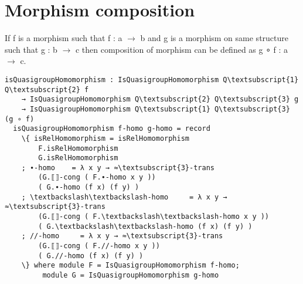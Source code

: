 \section{Morphism composition}
If f is a morphism such that f : a \(\rightarrow\) b and g is a morphism on same structure such that g : b \(\rightarrow\) c then composition of morphism can be defined as g ∘ f : a \(\rightarrow\) c.
\begin{comment}
module _ \{Q\textsubscript{1} : RawQuasigroup a ℓ\textsubscript{1}\}  \{Q\textsubscript{2} : RawQuasigroup b ℓ\textsubscript{2}\} \{Q\textsubscript{3} : RawQuasigroup c ℓ\textsubscript{3}\}
         (open RawQuasigroup) (≈\textsubscript{3}-trans : Transitive (_≈_ Q\textsubscript{3}))
         \{f : Carrier Q\textsubscript{1} → Carrier Q\textsubscript{2}\} \{g : Carrier Q\textsubscript{2} → Carrier Q\textsubscript{3}\}  where
\end{comment}
\begin{Verbatim}[commandchars=\\\{\},samepage=true]
  isQuasigroupHomomorphism : IsQuasigroupHomomorphism Q\textsubscript{1} Q\textsubscript{2} f
    → IsQuasigroupHomomorphism Q\textsubscript{2} Q\textsubscript{3} g 
    → IsQuasigroupHomomorphism Q\textsubscript{1} Q\textsubscript{3} (g ∘ f)
  isQuasigroupHomomorphism f-homo g-homo = record
    \{ isRelHomomorphism = isRelHomomorphism		
		F.isRelHomomorphism
		G.isRelHomomorphism
    ; ∙-homo    = λ x y → ≈\textsubscript{3}-trans 
		(G.⟦⟧-cong ( F.∙-homo x y )) 
		( G.∙-homo (f x) (f y) )
    ; \textbackslash\textbackslash-homo     = λ x y → ≈\textsubscript{3}-trans 
		(G.⟦⟧-cong ( F.\textbackslash\textbackslash-homo x y )) 
		( G.\textbackslash\textbackslash-homo (f x) (f y) )
    ; //-homo     = λ x y → ≈\textsubscript{3}-trans 
		(G.⟦⟧-cong ( F.//-homo x y )) 
		( G.//-homo (f x) (f y) )
    \} where module F = IsQuasigroupHomomorphism f-homo; 
	     module G = IsQuasigroupHomomorphism g-homo

\end{Verbatim}
